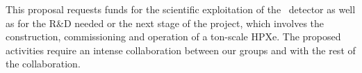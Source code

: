 
 \indent
 
 This proposal requests funds for the scientific exploitation of the \Next\ detector as well as for the R\&D needed or the next stage of the project, 
 which involves the construction, commissioning and operation of a ton-scale HPXe. The proposed activities require an intense collaboration between our groups and with the rest of the collaboration. 
 
 
 
